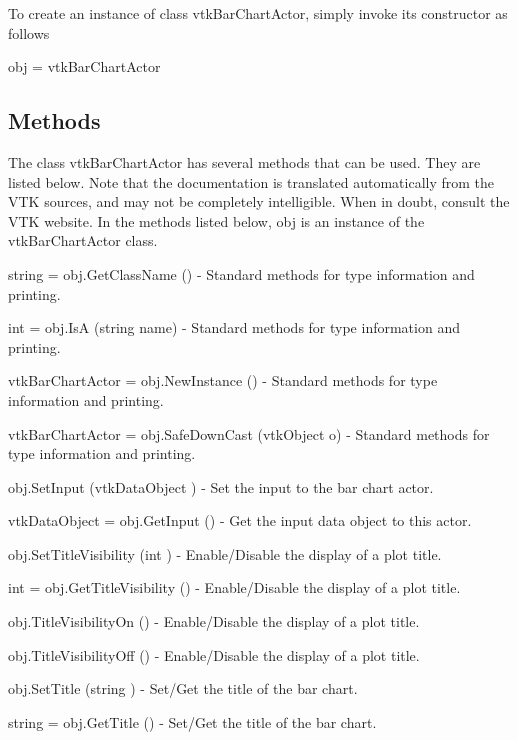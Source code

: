 To create an instance of class vtk\-Bar\-Chart\-Actor, simply invoke its constructor as follows \begin{DoxyVerb}  obj = vtkBarChartActor
\end{DoxyVerb}
 \hypertarget{vtkwidgets_vtkxyplotwidget_Methods}{}\subsection{Methods}\label{vtkwidgets_vtkxyplotwidget_Methods}
The class vtk\-Bar\-Chart\-Actor has several methods that can be used. They are listed below. Note that the documentation is translated automatically from the V\-T\-K sources, and may not be completely intelligible. When in doubt, consult the V\-T\-K website. In the methods listed below, {\ttfamily obj} is an instance of the vtk\-Bar\-Chart\-Actor class. 
\begin{DoxyItemize}
\item {\ttfamily string = obj.\-Get\-Class\-Name ()} -\/ Standard methods for type information and printing.  
\item {\ttfamily int = obj.\-Is\-A (string name)} -\/ Standard methods for type information and printing.  
\item {\ttfamily vtk\-Bar\-Chart\-Actor = obj.\-New\-Instance ()} -\/ Standard methods for type information and printing.  
\item {\ttfamily vtk\-Bar\-Chart\-Actor = obj.\-Safe\-Down\-Cast (vtk\-Object o)} -\/ Standard methods for type information and printing.  
\item {\ttfamily obj.\-Set\-Input (vtk\-Data\-Object )} -\/ Set the input to the bar chart actor.  
\item {\ttfamily vtk\-Data\-Object = obj.\-Get\-Input ()} -\/ Get the input data object to this actor.  
\item {\ttfamily obj.\-Set\-Title\-Visibility (int )} -\/ Enable/\-Disable the display of a plot title.  
\item {\ttfamily int = obj.\-Get\-Title\-Visibility ()} -\/ Enable/\-Disable the display of a plot title.  
\item {\ttfamily obj.\-Title\-Visibility\-On ()} -\/ Enable/\-Disable the display of a plot title.  
\item {\ttfamily obj.\-Title\-Visibility\-Off ()} -\/ Enable/\-Disable the display of a plot title.  
\item {\ttfamily obj.\-Set\-Title (string )} -\/ Set/\-Get the title of the bar chart.  
\item {\ttfamily string = obj.\-Get\-Title ()} -\/ Set/\-Get the title of the bar chart.  

\end{DoxyItemize}

